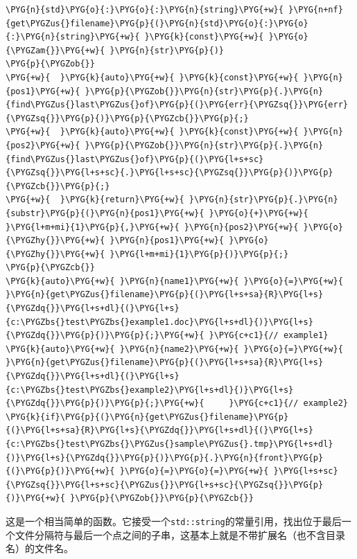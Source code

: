 \begin{codeblockbg}
\begin{Verbatim}[commandchars=\\\{\},breaklines=true,breakanywhere=true,fontsize=\codefont,xleftmargin=17bp]
\PYG{n}{std}\PYG{o}{:}\PYG{o}{:}\PYG{n}{string}\PYG{+w}{ }\PYG{n+nf}{get\PYGZus{}filename}\PYG{p}{(}\PYG{n}{std}\PYG{o}{:}\PYG{o}{:}\PYG{n}{string}\PYG{+w}{ }\PYG{k}{const}\PYG{+w}{ }\PYG{o}{\PYGZam{}}\PYG{+w}{ }\PYG{n}{str}\PYG{p}{)}
\PYG{p}{\PYGZob{}}
\PYG{+w}{  }\PYG{k}{auto}\PYG{+w}{ }\PYG{k}{const}\PYG{+w}{ }\PYG{n}{pos1}\PYG{+w}{ }\PYG{p}{\PYGZob{}}\PYG{n}{str}\PYG{p}{.}\PYG{n}{find\PYGZus{}last\PYGZus{}of}\PYG{p}{(}\PYG{err}{\PYGZsq{}}\PYG{err}{\PYGZsq{}}\PYG{p}{)}\PYG{p}{\PYGZcb{}}\PYG{p}{;}
\PYG{+w}{  }\PYG{k}{auto}\PYG{+w}{ }\PYG{k}{const}\PYG{+w}{ }\PYG{n}{pos2}\PYG{+w}{ }\PYG{p}{\PYGZob{}}\PYG{n}{str}\PYG{p}{.}\PYG{n}{find\PYGZus{}last\PYGZus{}of}\PYG{p}{(}\PYG{l+s+sc}{\PYGZsq{}}\PYG{l+s+sc}{.}\PYG{l+s+sc}{\PYGZsq{}}\PYG{p}{)}\PYG{p}{\PYGZcb{}}\PYG{p}{;}
\PYG{+w}{  }\PYG{k}{return}\PYG{+w}{ }\PYG{n}{str}\PYG{p}{.}\PYG{n}{substr}\PYG{p}{(}\PYG{n}{pos1}\PYG{+w}{ }\PYG{o}{+}\PYG{+w}{ }\PYG{l+m+mi}{1}\PYG{p}{,}\PYG{+w}{ }\PYG{n}{pos2}\PYG{+w}{ }\PYG{o}{\PYGZhy{}}\PYG{+w}{ }\PYG{n}{pos1}\PYG{+w}{ }\PYG{o}{\PYGZhy{}}\PYG{+w}{ }\PYG{l+m+mi}{1}\PYG{p}{)}\PYG{p}{;}
\PYG{p}{\PYGZcb{}}
\PYG{k}{auto}\PYG{+w}{ }\PYG{n}{name1}\PYG{+w}{ }\PYG{o}{=}\PYG{+w}{ }\PYG{n}{get\PYGZus{}filename}\PYG{p}{(}\PYG{l+s+sa}{R}\PYG{l+s}{\PYGZdq{}}\PYG{l+s+dl}{(}\PYG{l+s}{c:\PYGZbs{}test\PYGZbs{}example1.doc}\PYG{l+s+dl}{)}\PYG{l+s}{\PYGZdq{}}\PYG{p}{)}\PYG{p}{;}\PYG{+w}{ }\PYG{c+c1}{// example1}
\PYG{k}{auto}\PYG{+w}{ }\PYG{n}{name2}\PYG{+w}{ }\PYG{o}{=}\PYG{+w}{ }\PYG{n}{get\PYGZus{}filename}\PYG{p}{(}\PYG{l+s+sa}{R}\PYG{l+s}{\PYGZdq{}}\PYG{l+s+dl}{(}\PYG{l+s}{c:\PYGZbs{}test\PYGZbs{}example2}\PYG{l+s+dl}{)}\PYG{l+s}{\PYGZdq{}}\PYG{p}{)}\PYG{p}{;}\PYG{+w}{     }\PYG{c+c1}{// example2}
\PYG{k}{if}\PYG{p}{(}\PYG{n}{get\PYGZus{}filename}\PYG{p}{(}\PYG{l+s+sa}{R}\PYG{l+s}{\PYGZdq{}}\PYG{l+s+dl}{(}\PYG{l+s}{c:\PYGZbs{}test\PYGZbs{}\PYGZus{}sample\PYGZus{}.tmp}\PYG{l+s+dl}{)}\PYG{l+s}{\PYGZdq{}}\PYG{p}{)}\PYG{p}{.}\PYG{n}{front}\PYG{p}{(}\PYG{p}{)}\PYG{+w}{ }\PYG{o}{=}\PYG{o}{=}\PYG{+w}{ }\PYG{l+s+sc}{\PYGZsq{}}\PYG{l+s+sc}{\PYGZus{}}\PYG{l+s+sc}{\PYGZsq{}}\PYG{p}{)}\PYG{+w}{ }\PYG{p}{\PYGZob{}}\PYG{p}{\PYGZcb{}}
\end{Verbatim}
\end{codeblockbg}



这是一个相当简单的函数。它接受一个\texttt{std::\allowbreak{}string}的常量引用，找出位于最后一个文件分隔符与最后一个点之间的子串，这基本上就是不带扩展名（也不含目录名）的文件名。


